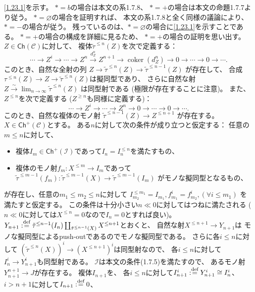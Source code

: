 \documentclass[uplatex,dvipdfmx]{jsarticle}
\makeatletter
\theoremstyle{definition}
\renewenvironment{proof}[1][\proofname]{
  \pushQED{\qed}%
  \normalfont \topsep6\p@\@plus6\p@\relax
  \trivlist
  \item[\hskip\labelsep
    #1\@addpunct{\textbf{.}}]\ignorespaces
}{%
  \popQED\endtrivlist\@endpefalse
}
\providecommand{\proofname}{証明}
\DeclareMathOperator{\coker}{\mathrm{coker}}
\newcommand{\Ch}{\mathsf{Ch}}
\newcommand\mcC{\mathcal{C}}
\newcommand\mcI{\mathcal{I}}
\renewcommand{\emptyset}{\varnothing}
\def\dfn{:\overset{\mbox{{\scriptsize def}}}{=}}
\makeatother
\begin{document}
\begin{proof}
  \ref{1.23.1}を示す。
  \(*=b\)の場合は本文の系1.7.8、
  \(*=+\)の場合は本文の命題1.7.7より従う。
  \(*=\emptyset\)の場合を証明すれば、
  本文の系1.7.8と全く同様の議論により、\(*=-\)の場合が従う。
  残っているのは、\(*=\emptyset\)の場合に\ref{1.23.1}を示すことである。
  \(*=+\)の場合の構成を詳細に見るため、
  \(*=+\)の場合の証明を思い出す。
  \(Z\in \Ch(\mcC)\)に対して、
  複体\(\tilde{\tau}^{\leq n}(Z)\)を次で定義する：
  \[
  \cdots \to Z^i \to \cdots \to Z^n \xrightarrow{d_Z^n} Z^{n+1}
  \to \coker(d_Z^n) \to 0 \to \cdots \to 0 \to \cdots.
  \]
  このとき、自然な全射の列
  \(Z\to \tilde{\tau}^{\leq n}(Z)\to \tilde{\tau}^{\leq n-1}(Z)\)
  が存在して、
  合成\(\tau^{\leq n}(Z) \to Z \to \tilde{\tau}^{\leq n}(Z)\)は擬同型であり、
  さらに自然な射
  \(Z \xrightarrow{\sim} \lim_{n\to \infty}\tilde{\tau}^{\leq n}(Z)\)
  は同型射である (極限が存在することに注意)。
  また、\(Z^{\leq n}\)を次で定義する (\(Z^{\geq n}\)も同様に定義する)：
  \[
  \cdots \to Z^i \to \cdots \to Z^n \to 0 \to \cdots \to 0 \to \cdots.
  \]
  このとき、自然な複体のモノ射
  \(\tilde{\tau}^{\leq n-1}(Z) \to Z^{\leq n+1}\)
  が存在する。
  \(X\in \Ch^+(\mcC)\)とする。
  ある\(n\)に対して次の条件が成り立つと仮定する：
  任意の\(m\leq n\)に対して、
  \begin{itemize}
    \item 複体\(I_m\in \Ch^+(\mcI)\)であって\(I_n = I_n^{\leq n}\)を満たすもの、
    \item 複体のモノ射\(f_m:X^{\leq m}\to I_m\)であって
    \(\tilde{\tau}^{\leq m-1}(f_m):
    \tilde{\tau}^{\leq m-1}(X) \to \tilde{\tau}^{\leq m-1}(I_m)\)
    がモノな擬同型となるもの、
  \end{itemize}
  が存在し、任意の\(m_1\leq m_2\leq n\)に対して
  \(I_{m_2}^{\leq m_1} = I_{m_1}, f_{m_1}^i = f_{m_2}^i, (\forall i\leq m_1)\)
  を満たすと仮定する。
  この条件は十分小さい\(n\ll 0\)に対してはつねに満たされる
  (\(n\ll 0\)に対しては\(X^{\leq n} = 0\)なので\(I_n=0\)とすれば良い)。
  \(Y_{n+1} \dfn \tilde{\tau}^{\leq n-1}(I_n)
  \coprod_{\tilde{\tau}^{\leq n-1}(X)} X^{\leq n+1}\)とおくと、
  自然な射\(X^{\leq n+1}\to Y_{n+1}\)は
  モノな擬同型によるpush-outであるのでモノな擬同型である。
  さらに各\(i\leq n\)に対して
  \((\tilde{\tau}^{\leq n}(X))^i \to (X^{\leq n+1})^i\)は同型射なので、
  各\(i\leq n\)に対して\(I_n^i \to Y_{n+1}^i\)も同型射である。
  \(\mcI\)は本文の条件(1.7.5)を満たすので、
  あるモノ射\(Y_{n+1}^{n+1} \to J\)が存在する。
  複体\(I_{n+1}\)を、
  各\(i\leq n\)に対して\(I_{n+1}^i \dfn Y_{n+1}^i \cong I_n^i\)、
  \(i > n+1\)に対して\(I_{n+1}\dfn 0\)、

\end{proof}
\end{document}
